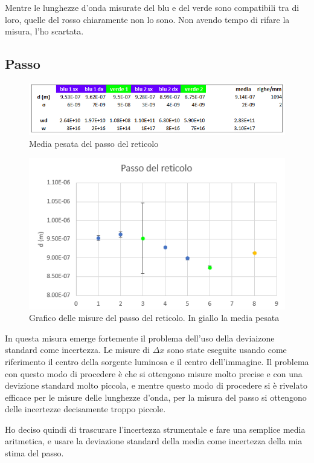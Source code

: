 \documentclass{article}
\begin{document}
Mentre le lunghezze d'onda misurate del blu e del verde sono compatibili tra di loro, quelle del rosso chiaramente non lo sono. Non avendo tempo di rifare la misura, l'ho scartata.

\clearpage

\subsection{Passo}

\begin{figure}[h!]
  \centering
  \includegraphics[width=0.6\linewidth]{IM_d}
  \caption{Media pesata del passo del reticolo}
\end{figure}

\begin{figure}[h!]
  \centering
  \includegraphics[width=0.6\linewidth]{IM grafico_d}
  \caption{Grafico delle misure del passo del reticolo. In giallo la media pesata}
\end{figure}

In questa misura emerge fortemente il problema dell'uso della deviaizone standard come incertezza. Le misure di $\Delta x$ sono state eseguite usando come riferimento il centro della sorgente luminosa e il centro dell'immagine. Il problema con questo modo di procedere è che si ottengono misure molto precise e con una devizione standard molto piccola, e mentre questo modo di procedere si è rivelato efficace per le misure delle lunghezze d'onda, per la misura del passo si ottengono delle incertezze decisamente troppo piccole.

\vspace{3mm}

Ho deciso quindi di trascurare l'incertezza strumentale e fare una semplice media aritmetica, e usare la deviazione standard della media come incertezza della mia stima del passo.
\end{document}
